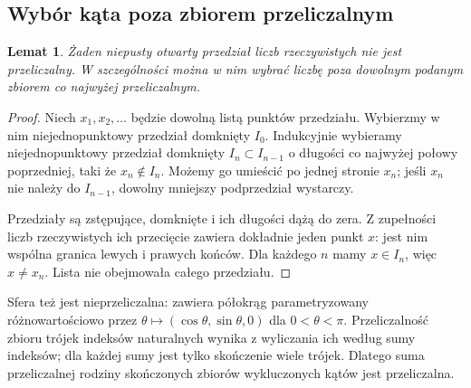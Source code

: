 \documentclass[11pt,a4paper]{article}
\numberwithin{equation}{section}
\theoremstyle{plain}
\newtheorem{lemat}[twierdzenie]{Lemat}
\theoremstyle{definition}
\theoremstyle{remark}
\begin{document}
\subsection{Wybór kąta poza zbiorem przeliczalnym}
\begin{lemat}\label{lem:nieprzeliczalnosc}
Żaden niepusty otwarty przedział liczb rzeczywistych nie jest przeliczalny. W szczególności można w nim wybrać liczbę poza dowolnym podanym zbiorem co najwyżej przeliczalnym.
\end{lemat}
\begin{proof}
Niech $x_1,x_2,\ldots$ będzie dowolną listą punktów przedziału. Wybierzmy w nim niejednopunktowy przedział domknięty $I_0$. Indukcyjnie wybieramy niejednopunktowy przedział domknięty $I_n\subset I_{n-1}$ o długości co najwyżej połowy poprzedniej, taki że $x_n\notin I_n$. Możemy go umieścić po jednej stronie $x_n$; jeśli $x_n$ nie należy do $I_{n-1}$, dowolny mniejszy podprzedział wystarczy.

Przedziały są zstępujące, domknięte i ich długości dążą do zera. Z zupełności liczb rzeczywistych ich przecięcie zawiera dokładnie jeden punkt $x$: jest nim wspólna granica lewych i prawych końców. Dla każdego $n$ mamy $x\in I_n$, więc $x\ne x_n$. Lista nie obejmowała całego przedziału.
\end{proof}
Sfera też jest nieprzeliczalna: zawiera półokrąg parametryzowany różnowartościowo przez $\theta\mapsto(\cos\theta,\sin\theta,0)$ dla $0<\theta<\pi$. Przeliczalność zbioru trójek indeksów naturalnych wynika z wyliczania ich według sumy indeksów; dla każdej sumy jest tylko skończenie wiele trójek. Dlatego suma przeliczalnej rodziny skończonych zbiorów wykluczonych kątów jest przeliczalna.
\end{document}
